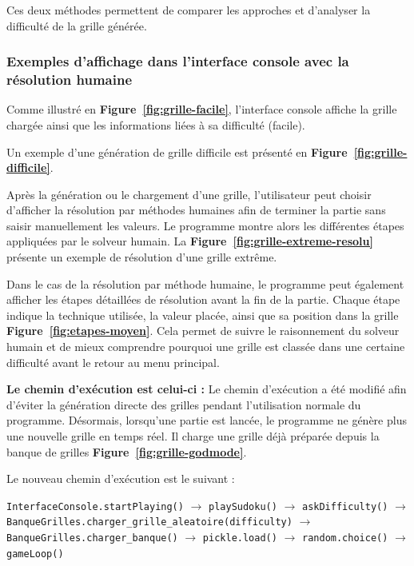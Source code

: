 \documentclass[a4paper]{article}
\begin{document}
Ces deux méthodes permettent de comparer les approches et d’analyser la difficulté de la grille générée. 

\subsubsection{Exemples d'affichage dans l'interface console avec la résolution humaine}

Comme illustré en \textbf{Figure~\ref{fig:grille-facile}}, l'interface console affiche la grille chargée ainsi que les informations liées à sa difficulté (facile).

Un exemple d'une génération de grille difficile est présenté en \textbf{Figure~\ref{fig:grille-difficile}}.

Après la génération ou le chargement d'une grille, l'utilisateur peut choisir d'afficher la résolution par méthodes humaines afin de terminer la partie sans saisir manuellement les valeurs. 
Le programme montre alors les différentes étapes appliquées par le solveur humain. 
La \textbf{Figure~\ref{fig:grille-extreme-resolu}} présente un exemple de résolution d'une grille extrême.


Dans le cas de la résolution par méthode humaine, le programme peut également afficher les étapes détaillées de résolution avant la fin de la partie. 
Chaque étape indique la technique utilisée, la valeur placée, ainsi que sa position dans la grille \textbf{Figure~\ref{fig:etapes-moyen}}. 
Cela permet de suivre le raisonnement du solveur humain et de mieux comprendre pourquoi une grille est classée dans une certaine difficulté avant le retour au menu principal.


\textbf{Le chemin d’exécution est celui-ci :}
Le chemin d'exécution a été modifié afin d'éviter la génération directe des grilles pendant l'utilisation normale du programme. 
Désormais, lorsqu'une partie est lancée, le programme ne génère plus une nouvelle grille en temps réel. 
Il charge une grille déjà préparée depuis la banque de grilles \textbf{Figure~\ref{fig:grille-godmode}}.

Le nouveau chemin d'exécution est le suivant :

\begin{center}
\texttt{InterfaceConsole.startPlaying()} 
$\rightarrow$ \texttt{playSudoku()} 
$\rightarrow$ \texttt{askDifficulty()} 
$\rightarrow$ \texttt{BanqueGrilles.charger\_grille\_aleatoire(difficulty)}
$\rightarrow$ \texttt{BanqueGrilles.charger\_banque()}
$\rightarrow$ \texttt{pickle.load()}
$\rightarrow$ \texttt{random.choice()}
$\rightarrow$ \texttt{gameLoop()}
\end{center}
\end{document}
